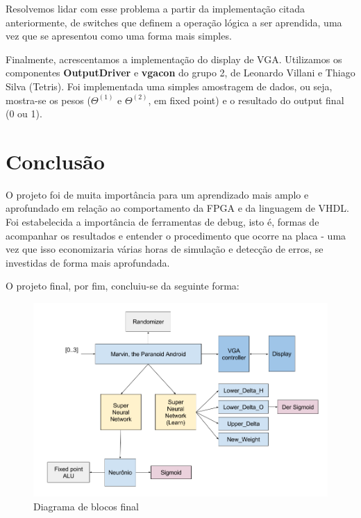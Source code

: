     Resolvemos lidar com esse problema a partir da implementação citada anteriormente, de switches que definem a operação lógica a ser aprendida, uma vez que se apresentou como uma forma mais simples.

    Finalmente, acrescentamos a implementação do display de VGA. Utilizamos os componentes \textbf{OutputDriver} e \textbf{vgacon} do grupo 2, de Leonardo Villani e Thiago Silva (Tetris). Foi implementada uma simples amostragem de dados, ou seja, mostra-se os pesos ($\Theta^{(1)}$ e $\Theta^{(2)}$, em fixed point) e o resultado do output final (0 ou 1).

\section{Conclusão}
    O projeto foi de muita importância para um aprendizado mais amplo e aprofundado em relação ao comportamento da FPGA e da linguagem de VHDL. Foi estabelecida a importância de ferramentas de debug, isto é, formas de acompanhar os resultados e entender o procedimento que ocorre na placa - uma vez que isso economizaria várias horas de simulação e detecção de erros, se investidas de forma mais aprofundada.

    O projeto final, por fim, concluiu-se da seguinte forma:

   \begin{figure}[ht!]
      \centering
      \includegraphics[width=13cm]{figures/blk_d_new}
      \caption{Diagrama de blocos final} 
      \label{fig:arch}
    \end{figure}

 



